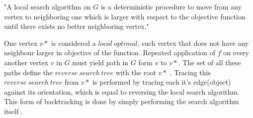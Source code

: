 "A local search algorithm on $G$ is a deterministic procedure to move from any vertex to neighboring one which is larger with respect to the objective function until there exists no better neighboring vertex." \parencite{avis1996reverse}

One vertex $v\ast$ is considered a $local\ optimal$, such vertex that does not have any neighbour larger in objective of the function. Repeated application of $f$ on every another vertex $v$ in $G$ must yield path in $G$ form $v$ to $v\ast$. The set of all these paths define the $reverse\ search\ tree$ with the root $v\ast$ \parencite{david2000tutorial}. Tracing this $reverse\ search\ tree$ from $v\ast$ is performed by tracing each it's edge(object) against its orientation, which is equal to reversing the local search algorithm. This form of backtracking is done by simply performing the search algorithm itself \parencite{avis1996reverse}. 

